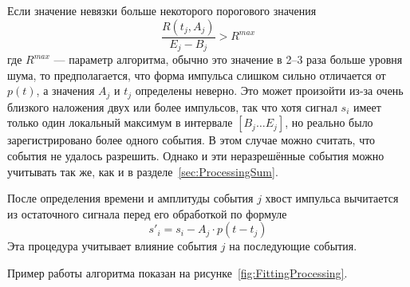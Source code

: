 

Если значение невязки больше некоторого порогового значения 
\begin{equation*}
  \frac{ R(t_j,A_j) }{ E_j - B_j } > R^{max}
\end{equation*}
где $R^{max}$ --- параметр алгоритма, обычно это значение в 2--3 раза больше уровня шума, то предполагается, что форма импульса слишком сильно отличается от $p(t)$, а значения $A_j$ и $t_j$ определены неверно. Это может произойти из-за очень близкого наложения двух или более импульсов, так что хотя сигнал $s_i$ имеет только один локальный максимум в интервале $\left[ B_j \ldots E_j \right] $, но реально было зарегистрировано более одного события. В этом случае можно считать, что события не удалось разрешить. Однако и эти неразрешённые события можно учитывать так же, как и в разделе~\ref{sec:ProcessingSum}.


После определения времени и амплитуды события $j$ хвост импульса вычитается из остаточного сигнала перед его обработкой по формуле
\begin{equation*}
  s'_i = s_i - A_j \cdot p( t - t_j )
\end{equation*}
Эта процедура учитывает влияние события $j$ на последующие события.

Пример работы алгоритма показан на рисунке~\ref{fig:FittingProcessing}.

